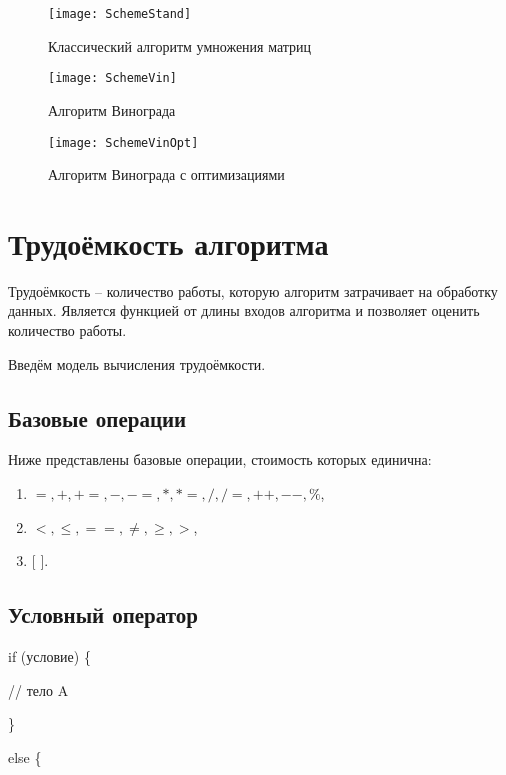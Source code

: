 \documentclass[utf8x, 12pt]{G7-32}
\begin{document}
    \begin{figure}[!htbp]
        \centering
        \texttt{[image: SchemeStand]}
        \caption{Классический алгоритм умножения матриц}
        \label{schema:num_1}
    \end{figure}

    \begin{figure}[!htbp]
        \centering
        \texttt{[image: SchemeVin]}
        \caption{Алгоритм Винограда}
        \label{schema:num_2}
    \end{figure}

    \begin{figure}[!htbp]
        \centering
        \texttt{[image: SchemeVinOpt]}
        \caption{Алгоритм Винограда с оптимизациями}
        \label{schema:num_3}
    \end{figure}

\newpage
    \section{Трудоёмкость алгоритма}
        Трудоёмкость -- количество работы, которую алгоритм затрачивает на обработку данных.
        Является функцией от длины входов алгоритма и позволяет оценить количество работы.

        Введём модель вычисления трудоёмкости.

        \subsection{Базовые операции}
            Ниже представлены базовые операции, стоимость которых единична:
            \begin{enumerate}
                \item $ =, +, +=, -, -=, *, *=,  /, /=, ++, --, \% $,
                \item $ <, \leqslant, ==, \neq, \geqslant , > $,
                \item $ [ $  $ ] $.
            \end{enumerate}
            
        \subsection{Условный оператор}
            if (условие) \{

                // тело A

            \}

            else \{
\end{document}
